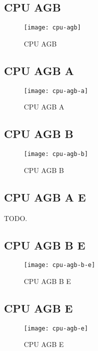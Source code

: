 \subsection{CPU AGB}

\begin{figure}[H]
  \centering
  \texttt{[image: cpu-agb]}
  \caption{CPU AGB}
\end{figure}

\subsection{CPU AGB A}

\begin{figure}[H]
  \centering
  \texttt{[image: cpu-agb-a]}
  \caption{CPU AGB A}
\end{figure}

\subsection{CPU AGB B}

\begin{figure}[H]
  \centering
  \texttt{[image: cpu-agb-b]}
  \caption{CPU AGB B}
\end{figure}

\subsection{CPU AGB A E}

TODO.

\subsection{CPU AGB B E}

\begin{figure}[H]
  \centering
  \texttt{[image: cpu-agb-b-e]}
  \caption{CPU AGB B E}
\end{figure}

\subsection{CPU AGB E}

\begin{figure}[H]
  \centering
  \texttt{[image: cpu-agb-e]}
  \caption{CPU AGB E}
\end{figure}
